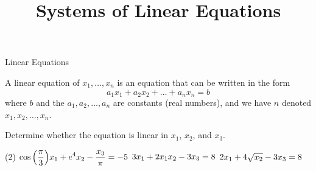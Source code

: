 \documentclass[xcolor=dvipsnames,aspectratio=169,t]{beamer}
\title{Systems of Linear Equations}
\begin{document}
\maketitle

\begin{frame}{Linear Equations}

  A \alert{linear equation} of $x_1, \dots, x_n$ is an equation that can be written in the form
  \[ a_1x_1 + a_2x_2 + \ldots + a_nx_n = b \]
  where
  \bi
  \ii $b$ and the  $a_1, a_2, \ldots , a_n$ are constants (real numbers), and
  \ii we have $n$  denoted $x_1, x_2, \ldots , x_n$. 
  \ei
  
  \pause
  \begin{example}
    Determine whether the equation is \alert{linear} in $x_1$, $x_2$, and $x_3$.
    \medskip
    
    \begin{tasks}(2)
      \task $\displaystyle  \cos{ \left( \frac{\pi}{3} \right)} x_1 + e^4 x_2 -  \frac{x_3}{\pi} = -5$
      \task $\displaystyle  3x_1 + 2x_1x_2 - 3x_3 = 8$
      \bigskip
      \task $\displaystyle  2 x_1 +  4 \sqrt{x_2} - 3x_3 = 8$
    \end{tasks}
  \end{example}
   
  \end{frame}
\end{document}
